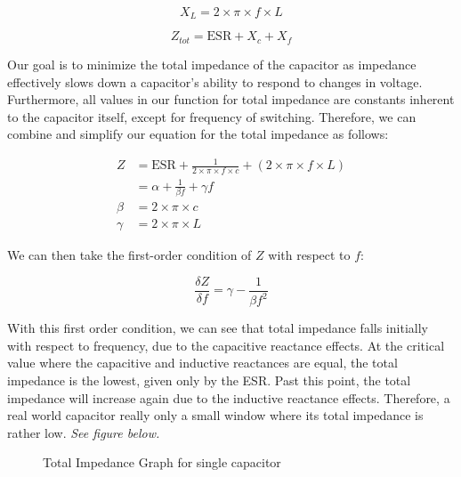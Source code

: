 \documentclass[11pt]{article}
\begin{document}
\begin{equation}
	X_L = 2 \times \pi \times f \times L
\end{equation}

\begin{equation}
	Z_{tot} = \text{ESR} + X_c + X_f	
\end{equation}

Our goal is to minimize the total impedance of the capacitor as impedance effectively slows down a capacitor's ability to respond to changes in voltage. Furthermore, all values in our function for total impedance are constants inherent to the capacitor itself, except for frequency of switching. Therefore, we can combine and simplify our equation for the total impedance as follows: 

\begin{equation}
\begin{aligned}
	Z &= \text{ESR} + \frac{1}{2 \times \pi \times f \times c} + (2 \times \pi \times f \times L) \\
	&= \alpha + \frac{1}{\beta f} + \gamma f \\
	\beta &= 2 \times \pi \times c \\
	\gamma &= 2 \times \pi \times L 
\end{aligned}
\end{equation}

We can then take the first-order condition of \(Z\) with respect to \(f\): 

\begin{equation}
	\frac{\delta Z}{\delta f} = \gamma - \frac{1}{\beta f^2} 
\end{equation}

With this first order condition,  we can see that total impedance falls initially with respect to frequency, due to the capacitive reactance effects. At the critical value where the capacitive and inductive reactances are equal, the total impedance is the lowest, given only by the ESR.\footnotemark {} Past this point, the total impedance will increase again due to the inductive reactance effects. Therefore, a real world capacitor really only a small window where its total impedance is rather low. \emph{See figure below.}\footnotemark

\begin{figure}[h!]
  \begin{center}
    \caption{Total Impedance Graph for single capacitor}
  \end{center}
\end{figure}
\end{document}
